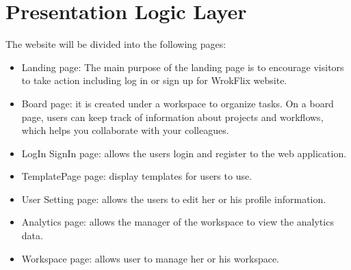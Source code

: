 \section{Presentation Logic Layer}

The website will be divided into the following pages:
\begin{itemize}
    \item Landing page: The main purpose of the landing page is to encourage visitors to take action including log in or sign up for WrokFlix website.
    \item Board page: it is created under a workspace to organize tasks. On a board page, users can keep track of information about projects and workflows, which helps you collaborate with your colleagues.
    \item LogIn SignIn page: allows the users login and register to the web application. 
    \item TemplatePage page: display templates for users to use.
    \item User Setting page: allows the users to edit her or his profile information.
    \item Analytics page: allows the manager of the workspace to view the analytics data.
    \item Workspace page: allows user to manage her or his workspace.
\end{itemize}








